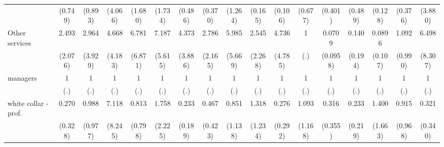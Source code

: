 {\begin{tabular}{l*{16}{c}}
                    &     (0.749)         &     (0.893)         &     (4.066)         &     (1.680)         &     (1.734)         &     (0.486)         &     (0.370)         &     (1.264)         &     (0.165)         &     (0.106)         &     (0.677)         &     (0.401)         &     (0.489)         &     (0.128)         &     (0.376)         &     (3.880)         \\
[1em]
Other services      &       2.493         &       2.964         &       4.668         &       6.781         &       7.187\sym{*}  &       4.373         &       2.786         &       5.985         &       2.545         &       4.736         &           1         &      0.0709         &       0.140         &      0.0896\sym{*}  &       1.092         &       6.498         \\
                    &     (2.076)         &     (3.929)         &     (4.183)         &     (6.871)         &     (5.615)         &     (3.886)         &     (2.165)         &     (5.669)         &     (2.268)         &     (4.785)         &         (.)         &    (0.0958)         &     (0.194)         &     (0.107)         &     (0.990)         &     (8.307)         \\
[1em]
managers            &           1         &           1         &           1         &           1         &           1         &           1         &           1         &           1         &           1         &           1         &           1         &           1         &           1         &           1         &           1         &           1         \\
                    &         (.)         &         (.)         &         (.)         &         (.)         &         (.)         &         (.)         &         (.)         &         (.)         &         (.)         &         (.)         &         (.)         &         (.)         &         (.)         &         (.)         &         (.)         &         (.)         \\
[1em]
white collar - prof.&       0.270         &       0.988         &       7.118         &       0.813         &       1.758         &       0.233         &       0.467         &       0.851         &       1.318         &       0.276         &       1.093         &       0.316         &       0.233         &       1.400         &       0.915         &       0.321         \\
                    &     (0.328)         &     (0.977)         &     (8.245)         &     (0.798)         &     (2.225)         &     (0.189)         &     (0.423)         &     (1.138)         &     (1.234)         &     (0.292)         &     (1.168)         &     (0.355)         &     (0.219)         &     (1.663)         &     (0.968)         &     (0.340)         \\

\end{tabular}}
